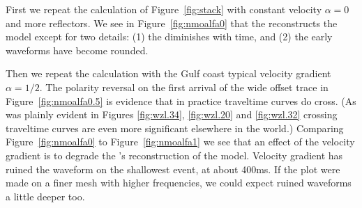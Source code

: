 First we repeat the calculation of Figure~\ref{fig:stack}
with constant velocity $\alpha=0$ and more reflectors.
We see in Figure~\ref{fig:nmoalfa0} that the  reconstructs
the model except for two details:
(1) the  diminishes with time, and 
(2) the early waveforms have become rounded.


Then we repeat the calculation
with the Gulf coast typical velocity gradient $\alpha=1/2$.
The polarity reversal on the first arrival of the wide offset trace
in Figure~\ref{fig:nmoalfa0.5}
is evidence that in practice traveltime curves do cross.
(As was plainly evident in Figures
\ref{fig:wzl.34},
\ref{fig:wzl.20} and
\ref{fig:wzl.32}
crossing traveltime curves are even more significant elsewhere in the world.)
Comparing Figure~\ref{fig:nmoalfa0} to Figure~\ref{fig:nmoalfa1}
we see that an effect of the velocity gradient
is to degrade the 's reconstruction of the model.
Velocity gradient has ruined the waveform on the shallowest event,
at about 400ms.
If the plot were made on a finer mesh
with higher frequencies,
we could expect ruined waveforms a little deeper too.



